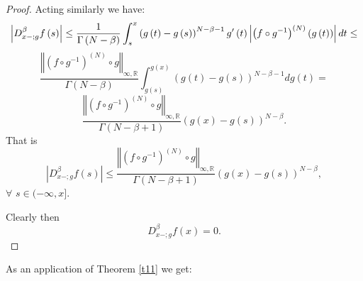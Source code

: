 \documentclass[10pt]{NSP1}
\numberwithin{equation}{section}
\begin{document}
\begin{proof}
Acting similarly we have:
\begin{equation*}
\left \vert D_{x-;g}^{\beta }f\left( s\right) \right \vert \leq \frac{1}{%
\Gamma \left( N-\beta \right) }\int_{s}^{x}\left( g\left( t\right) -g\left(
s\right) \right) ^{N-\beta -1}g^{\prime }\left( t\right) \left \vert \left(
f\circ g^{-1}\right) ^{\left( N\right) }\left( g\left( t\right) \right)
\right \vert dt\leq
\end{equation*}
\begin{equation}
\frac{\left \Vert \left( f\circ g^{-1}\right) ^{\left( N\right) }\circ
g\right \Vert _{\infty ,\mathbb{R}}}{\Gamma \left( N-\beta \right) }%
\int_{g\left( s\right) }^{g\left( x\right) }\left( g\left( t\right) -g\left(
s\right) \right) ^{N-\beta -1}dg\left( t\right) =  \tag{55}  \label{55}
\end{equation}
\begin{equation*}
\frac{\left \Vert \left( f\circ g^{-1}\right) ^{\left( N\right) }\circ
g\right \Vert _{\infty ,\mathbb{R}}}{\Gamma \left( N-\beta +1\right) }\left(
g\left( x\right) -g\left( s\right) \right) ^{N-\beta }.
\end{equation*}
That is
\begin{equation}
\left \vert D_{x-;g}^{\beta }f\left( s\right) \right \vert \leq \frac{\left
\Vert \left( f\circ g^{-1}\right) ^{\left( N\right) }\circ g\right \Vert
_{\infty ,\mathbb{R}}}{\Gamma \left( N-\beta +1\right) }\left( g\left(
x\right) -g\left( s\right) \right) ^{N-\beta },  \tag{56}  \label{56}
\end{equation}
$\forall $ $s\in (-\infty ,x].$

Clearly then
\begin{equation}
D_{x-;g}^{\beta }f\left( x\right) =0.  \tag{57}  \label{57}
\end{equation}
\end{proof}

As an application of Theorem \ref{t11} we get:
\end{document}
